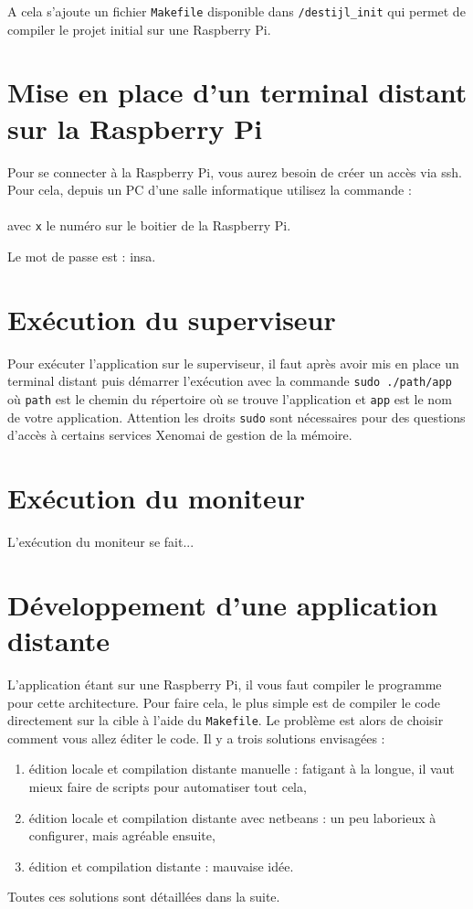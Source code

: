 \documentclass[11pt]{paper}
\newcommand{\raspi}{Raspberry Pi\xspace}
\begin{document}
A cela s'ajoute un fichier {\tt Makefile} disponible dans {\tt /destijl\_init} qui permet de compiler le projet initial sur une \raspi.


\section{Mise en place d'un terminal distant sur la \raspi}
\label{sec:ssh}

Pour se connecter à la \raspi, vous aurez besoin de créer un accès via ssh. Pour cela, depuis un PC d'une salle informatique utilisez la commande :\\ \indent{}\\
avec {\tt x} le numéro sur le boitier de la \raspi.

Le mot de passe est : insa.

\section{Exécution du superviseur}
\label{sec:utilisation}

Pour exécuter l'application sur le superviseur, il faut après avoir mis en place un terminal distant puis démarrer l'exécution avec la commande {\tt sudo ./path/app} où {\tt path} est le chemin du répertoire où se trouve l'application et {\tt app} est le nom de votre application. Attention les droits {\tt sudo} sont nécessaires pour des questions d'accès à certains services Xenomai de gestion de la mémoire.

\section{Exécution du moniteur}
\label{sec:utilisation}

L'exécution du moniteur se fait...


\section{Développement d'une application distante}

L'application étant sur une \raspi, il vous faut compiler le programme pour cette architecture. Pour faire cela, le plus simple est de compiler le code directement sur la cible à l'aide du {\tt Makefile}. Le problème est alors de choisir comment vous allez éditer le code. Il y a trois solutions envisagées :
\begin{enumerate}
\item édition locale et compilation distante manuelle : fatigant à la longue, il vaut mieux faire de scripts pour automatiser tout cela,
\item édition locale et compilation distante avec netbeans : un peu laborieux à configurer, mais agréable ensuite,
\item édition et compilation distante : mauvaise idée.
\end{enumerate}
Toutes ces solutions sont détaillées dans la suite.
\end{document}
